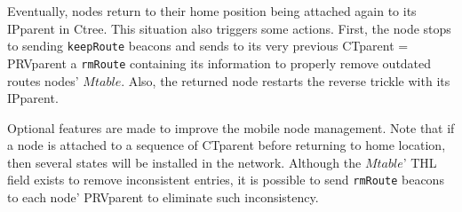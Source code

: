 Eventually, nodes return to their home position being attached again to its IPparent in Ctree. This situation also triggers some actions. First, the node stops to sending \texttt{keepRoute} beacons and sends to its very previous CTparent = PRVparent a \texttt{rmRoute} containing its information to properly remove outdated routes nodes' $Mtable$. Also, the returned node restarts the reverse trickle with its IPparent.

Optional features are made to improve the mobile node management. Note that if a node is attached to a sequence of CTparent before returning to home location, then several states will be installed in the network. Although the $Mtable$' THL field exists to remove inconsistent entries, it is possible to send \texttt{rmRoute} beacons to each node' PRVparent to eliminate such inconsistency.


